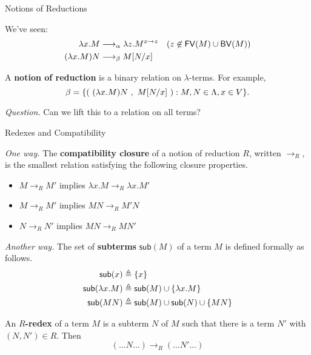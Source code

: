 \documentclass[10pt]{beamer}
\begin{document}
\begin{frame}{Notions of Reductions}

We've seen:
\begin{align*}
\lambda x . M &\longrightarrow_\alpha \lambda z . M^{x \to z} \quad (z \not \in \mathsf{FV}(M) \cup \mathsf{BV}(M)) \\
(\lambda x . M) N &\longrightarrow_\beta M[N/x]
\end{align*}
\pause

\begin{definition}
A \textbf{notion of reduction} is a binary relation on $\lambda$-terms. For example,
\begin{displaymath}
\beta = \{( \ (\lambda x . M) N \ , \ M[N/x] \ ) : M, N \in \Lambda, x \in V\}.
\end{displaymath}
\end{definition}
\nxt

\textit{Question.} Can we lift this to a relation on all terms?
\end{frame}

\begin{frame}{Redexes and Compatibility}

\textit{One way.}
The \textbf{compatibility closure} of a notion of reduction $R$, written $\rightarrow_R$, is the smallest relation satisfying the following closure properties.
\begin{itemize}
\item $M \rightarrow_R M'$ implies $\lambda x . M \rightarrow_R \lambda x . M'$
\item $M \rightarrow_R M'$ implies $MN \rightarrow_R M'N$
\item $N \rightarrow_R N'$ implies $MN \rightarrow_R MN'$
\end{itemize}
\nxt

\textit{Another way.}
The set of \textbf{subterms} $\mathsf{sub}(M)$ of a term $M$ is defined formally as follows.
\vspace{-.25cm}
\begin{align*}
\mathsf{sub}(x) &\triangleq \{x\} \\
\mathsf{sub}(\lambda x . M) &\triangleq \mathsf{sub}(M) \cup \{\lambda x . M\} \\
\mathsf{sub}(MN) &\triangleq \mathsf{sub}(M) \cup \mathsf{sub}(N) \cup \{MN\}
\end{align*}

An \textbf{$R$-redex} of a term $M$ is a subterm $N$ of $M$ such that there is a term $N'$ with $(N, N') \in R$. Then
\[
(\dots N \dots) \to_R (\dots N' \dots)
\]

\end{frame}
\end{document}
